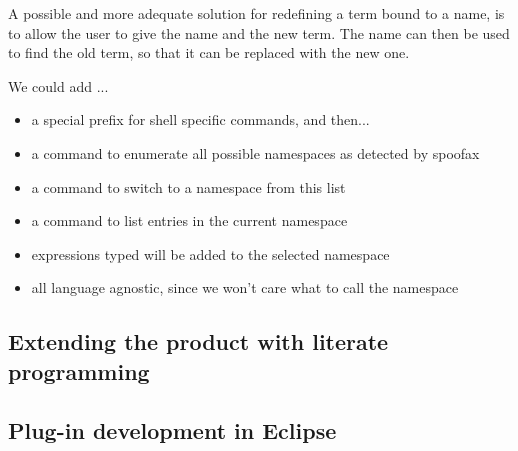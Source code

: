 A possible and more adequate solution for redefining a term bound to a
name, is to allow the user to give the name and the new term. The name
can then be used to find the old term, so that it can be replaced with
the new one.

We could add ...
\begin{itemize}
\item a special prefix for shell specific commands, and then...
\item a command to enumerate all possible namespaces as detected by spoofax
\item a command to switch to a namespace from this list
\item a command to list entries in the current namespace
\item expressions typed will be added to the selected namespace
\item all language agnostic, since we won't care what to call the namespace
\end{itemize}

\subsection{Extending the product with literate programming}
\label{sec:extend-prod-with}

\subsection{Plug-in development in Eclipse}
\label{ssec:eclipse-plugins}

